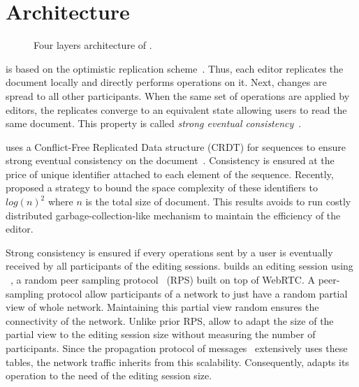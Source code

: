 
\section{Architecture}
\label{sec:architecture}

\begin{figure}
  \centering
  
  \caption{\label{fig:architecture} Four layers architecture of \CRATE.}
\end{figure}

\CRATE is based on the optimistic replication
scheme~\cite{saito2005optimistic}. Thus, each editor replicates the
document locally and directly performs operations on it. Next, changes
are spread to all other participants. When the same set of operations
are applied by editors, the replicates converge to an equivalent state
allowing users to read the same document.  This property is called
\emph{strong eventual consistency}~\cite{bailis2013eventual}.

\CRATE uses a Conflict\--Free Replicated Data structure (CRDT) for
sequences to ensure strong eventual consistency on the
document~\cite{shapiro2011comprehensive}. Consistency is ensured at
the price of unique identifier attached to each element of the
sequence. Recently, \LSEQ~\cite{nedelec2013lseq} proposed a strategy
to bound the space complexity of these identifiers to $log(n)^2$ where
$n$ is the total size of document. This results avoids to run costly
distributed garbage-collection-like mechanism to maintain the
efficiency of the editor.

Strong consistency is ensured if every operations sent by a user is
eventually received by all participants of the editing
sessions. \CRATE builds an editing session using
\SPRAY~\cite{nedelec2015spray}, a random peer sampling
protocol~\cite{jelasity2007gossip} (RPS) built on top of WebRTC. A
peer-sampling protocol allow participants of a network to just have a
random partial view of whole network. Maintaining this partial view
random ensures the connectivity of the network. Unlike prior RPS,
\SPRAY allow to adapt the size of the partial view to the editing
session size without measuring the number of participants. Since the
propagation protocol of messages~\cite{birman1999bimodal} extensively
uses these tables, the network traffic inherits from this
scalability. Consequently, \CRATE adapts its operation to the need of
the editing session size.


